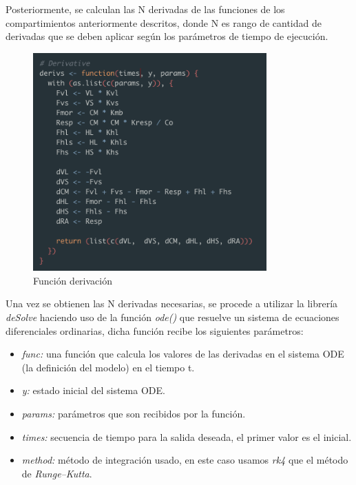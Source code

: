 Posteriormente, se calculan las N derivadas de las funciones de los compartimientos anteriormente descritos, donde N es rango de cantidad de derivadas que se deben aplicar seg\'un los par\'ametros de tiempo de ejecuci\'on.\\

\begin{figure}[H]
  \centering
    \begin{minipage}{0.8\textwidth}
      \centering
      \includegraphics[width=0.8\textwidth]{figure_4_11.png}
      \caption{Funci\'on derivaci\'on}
      \label{fig:Fig}
    \end{minipage}%
    \hspace{5mm}
\end{figure}

Una vez se obtienen las N derivadas necesarias, se procede a utilizar la librer\'ia \textit{deSolve} haciendo uso de la funci\'on \textit{ode()} que resuelve un sistema de ecuaciones diferenciales ordinarias, dicha función recibe los siguientes par\'ametros: \\

\begin{itemize}
  \item \textit{func:} una función que calcula los valores de las derivadas en el sistema ODE (la definición del modelo) en el tiempo t.
  \item \textit{y:} estado inicial del sistema ODE.
  \item \textit{params:} par\'ametros que son recibidos por la funci\'on.
  \item \textit{times:} secuencia de tiempo para la salida deseada, el primer valor es el inicial.
  \item \textit{method:} m\'etodo de integraci\'on usado, en este caso usamos \textit{rk4} que el m\'etodo de \textit{Runge–Kutta}.
\end{itemize}


